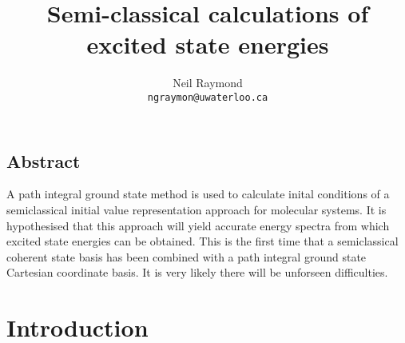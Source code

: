 \documentclass[12pt,letterpaper,oneside,final,titlepage]{article}               %
\numberwithin{equation}{section} %
\begin{document}
    \title{Semi-classical calculations of excited state energies}
    \author{Neil Raymond
           \\ \texttt{ngraymon@uwaterloo.ca}}
    \date{}
    \maketitle

\doublespacing

\subsection*{Abstract}
A path integral ground state method is used to calculate inital conditions of a semiclassical initial value representation approach for molecular systems. 
It is hypothesised that this approach will yield accurate energy spectra from which excited state energies can be obtained. 
This is the first time that a semiclassical coherent state basis has been combined with a path integral ground state Cartesian coordinate basis. It is very likely there will be unforseen difficulties.

\section{Introduction}
\end{document}
